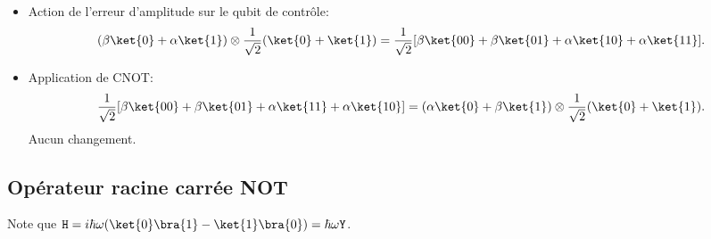 \begin{enumerate}
\begin{itemize}
\item Action de l'erreur d'amplitude sur le qubit de contrôle:
\begin{equation}
(\beta\ket{0} +\alpha\ket{1})\otimes\frac{1}{\sqrt{2}}(\ket{0}+\ket{1})
=\frac{1}{\sqrt{2}}[\beta\ket{00}+\beta\ket{01}+\alpha\ket{10}+\alpha\ket{11}].
\end{equation}

\item Application de CNOT:
\begin{equation}
\frac{1}{\sqrt{2}}[\beta\ket{00}+\beta\ket{01}+\alpha\ket{11}+\alpha\ket{10}]
=(\alpha\ket{0}+\beta\ket{1})\otimes\frac{1}{\sqrt{2}}(\ket{0}+\ket{1}).
\end{equation}
Aucun changement.
\end{itemize}
\end{enumerate}

\subsection{Opérateur racine carrée NOT}

Note que $\mathtt{H}=i\hbar\omega(\ket{0}\bra{1}-\ket{1}\bra{0})=\hbar\omega
\mathtt{Y}$.

